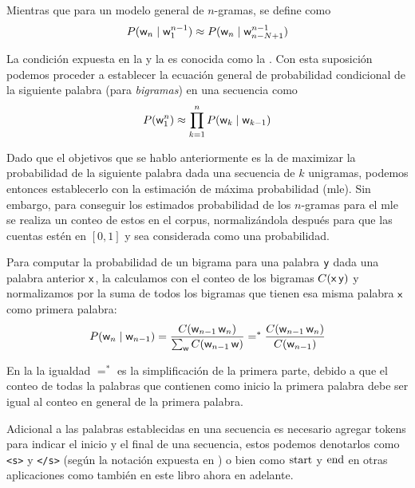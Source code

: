 Mientras que para un modelo general de $n$-gramas, se define como
\begin{equation} \label{eq:markov-assumption}
  P({\mathit{\mathsf{w}}}_n \mid {\mathit{\mathsf{w}}}_1^{n-1}) \approx P({\mathit{\mathsf{w}}}_n \mid {\mathit{\mathsf{w}}}_{n-N+1}^{n-1})
\end{equation}

La condición expuesta en la  y la  es conocida como la . Con esta suposición podemos proceder a establecer la ecuación general de probabilidad condicional de la siguiente palabra (para \textit{bigramas}) en una secuencia como
\begin{equation}
  P({\mathit{\mathsf{w}}}_1^{n}) \approx \prod_{k=1}^{n} P({\mathit{\mathsf{w}}}_k \mid {\mathit{\mathsf{w}}}_{k-1})
\end{equation}

Dado que el objetivos que se hablo anteriormente es la de maximizar la probabilidad de la siguiente palabra dada una secuencia de $k$ unigramas, podemos entonces establecerlo con la estimación de máxima probabilidad (\gls{mle}). Sin embargo, para conseguir los estimados probabilidad de los $n$-gramas para el \gls{mle} se realiza un conteo de estos en el \gls{corpus}, normalizándola después para que las cuentas estén en $[0, 1]$ y sea considerada como una probabilidad.

Para computar la probabilidad de un bigrama para una palabra ${\mathit{\mathsf{y}}}$ dada una palabra anterior ${\mathit{\mathsf{x}}}$, la calculamos con el conteo de los bigramas $C({\mathit{\mathsf{x}}} \, {\mathit{\mathsf{y}}})$ y normalizamos por la suma de todos los bigramas que tienen esa misma palabra ${\mathit{\mathsf{x}}}$ como primera palabra:
\begin{equation} \label{eq:bigram-prob-computation}
  P({\mathit{\mathsf{w}}}_n \mid {\mathit{\mathsf{w}}}_{n-1}) = \frac{C( {\mathit{\mathsf{w}}}_{n-1} \, {\mathit{\mathsf{w}}}_{n})}{ \sum_{\mathit{\mathsf{w}}} C({\mathit{\mathsf{w}}}_{n-1} \, {\mathit{\mathsf{w}}}) } =^{\ast} \frac{C( {\mathit{\mathsf{w}}}_{n-1} \, {\mathit{\mathsf{w}}}_{n})}{ C({\mathit{\mathsf{w}}}_{n-1}) }
\end{equation}

En la  la igualdad $=^{\ast}$ es la simplificación de la primera parte, debido a que el conteo de todas la palabras que contienen como inicio la primera palabra debe ser igual al conteo en general de la primera palabra.

Adicional a las palabras establecidas en una secuencia es necesario agregar tokens para indicar el inicio y el final de una secuencia, estos podemos denotarlos como \texttt{<s>} y \texttt{</s>} (según la notación expuesta en \cite{jurafsky-martin}) o bien como $\mathrm{start}$ y $\mathrm{end}$ en otras aplicaciones como también en este libro ahora en adelante.

